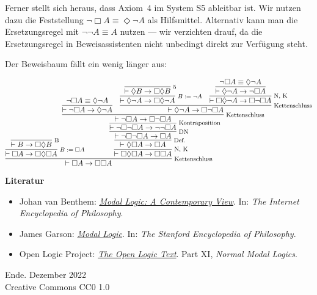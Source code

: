 \documentclass[8pt]{beamer}
\newcommand{\modest}[1]{{\small\color{gray}#1}}
\newcommand{\strong}[1]{\textsf{\textbf{#1}}}
\newcommand{\infernote}[1]{\!\text{\footnotesize #1}}
\newcommand{\parspace}{\vspace{0.8em}}
\newcommand{\cond}{\rightarrow}
\newcommand{\lnec}{\Box}
\newcommand{\lpos}{\Diamond}
\begin{document}
\begin{frame}
Ferner stellt sich heraus, dass Axiom~4 im System S5 ableitbar ist.
Wir nutzen dazu die Feststellung $\neg\lnec A\equiv\lpos\neg A$
als Hilfsmittel. Alternativ kann man die Ersetzungsregel mit
$\neg\neg A\equiv A$ nutzen --- wir verzichten drauf, da die
Ersetzungsregel in Beweisassistenten nicht unbedingt direkt zur
Verfügung steht.

\parspace
Der Beweisbaum fällt ein wenig länger aus:\pause

\[
\infer[\infernote{Kettenschluss}]{\vdash\lnec A\cond\lnec\lnec A}{
  \infer[\infernote{$B:=\lnec A$}]{\vdash\lnec A\cond\lnec\lpos\lnec A}{
    \infer[\infernote{B}]{\vdash B\cond\lnec \lpos B}{}}
& \hspace{-4em}\infer[\infernote{N, K}]{\vdash\lnec\lpos\lnec A\cond\lnec\lnec A}{
    \infer[\infernote{Def.}]{\vdash\lpos\lnec A\cond\lnec A}{
      \infer[\infernote{DN}]{\vdash\neg\lnec\neg\lnec A\cond\lnec A}{
        \infer[\infernote{Kontraposition}]{\vdash\neg\lnec\neg\lnec A\cond\neg\neg\lnec A}{
          \infer[\infernote{Kettenschluss}]{\vdash\neg\lnec A\cond\lnec\neg\lnec A}{
            \infer{\vdash\neg\lnec A\cond\lpos\neg A}{
              \neg\lnec A\equiv\lpos\neg A}
          & \infer[\infernote{Kettenschluss}]{\vdash\lpos\neg A\cond\lnec\neg\lnec A}{
              \infer[\infernote{$B:=\neg A$}]{\vdash\lpos\neg A\cond\lnec\lpos\neg A}{
                \infer[\infernote{5}]{\vdash\lpos B\cond\lnec\lpos B}{}}
            & \infer[\infernote{N, K}]{\vdash\lnec\lpos\neg A\cond\lnec\neg\lnec A}{
                \infer{\vdash\lpos\neg A\cond\neg\lnec A}{
                  \neg\lnec A\equiv\lpos\neg A}}}}}}}}}
\]
\end{frame}

\begin{frame}
\strong{Literatur}
\begin{itemize}
\item Johan van Benthem: \href{https://iep.utm.edu/modal-lo/}{\emph{Modal Logic: A Contemporary View}}.
In: \emph{The Internet Encyclopedia of Philosophy}.
\item James Garson: \href{https://plato.stanford.edu/entries/logic-modal/}{\emph{Modal Logic}}.
In: \emph{The Stanford Encyclopedia of Philosophy}.
\item Open Logic Project: \href{https://openlogicproject.org/}{\emph{The Open Logic Text}}.
  Part XI, \emph{Normal Modal Logics}.
\end{itemize}
\end{frame}

\begin{frame}
Ende.
\vfill\hfill\modest{Dezember 2022}\\
\hfill\modest{Creative Commons CC0 1.0}
\end{frame}
\end{document}
